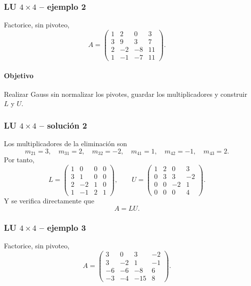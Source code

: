 \subsubsection*{LU $4\times 4$ -- ejemplo 2}

Factorice, sin pivoteo,
\[
A=\begin{pmatrix}1 & 2 & 0 & 3\\3 & 9 & 3 & 7\\2 & -2 & -8 & 11\\1 & -1 & -7 & 11\end{pmatrix}.
\]

\paragraph{Objetivo}
Realizar Gauss sin normalizar los pivotes, guardar los multiplicadores y construir $L$ y $U$.



\subsubsection*{LU $4\times 4$ -- solución 2}

Los multiplicadores de la eliminación son
\[
m_{21}=3,\quad m_{31}=2,\quad m_{32}=-2,\quad m_{41}=1,\quad m_{42}=-1,\quad m_{43}=2.
\]
Por tanto,
\[
L=\begin{pmatrix}1 & 0 & 0 & 0\\3 & 1 & 0 & 0\\2 & -2 & 1 & 0\\1 & -1 & 2 & 1\end{pmatrix},\qquad U=\begin{pmatrix}1 & 2 & 0 & 3\\0 & 3 & 3 & -2\\0 & 0 & -2 & 1\\0 & 0 & 0 & 4\end{pmatrix}.
\]
Y se verifica directamente que
\[
\boxed{A=LU}.
\]


\subsubsection*{LU $4\times 4$ -- ejemplo 3}

Factorice, sin pivoteo,
\[
A=\begin{pmatrix}3 & 0 & 3 & -2\\3 & -2 & 1 & -1\\-6 & -6 & -8 & 6\\-3 & -4 & -15 & 8\end{pmatrix}.
\]

